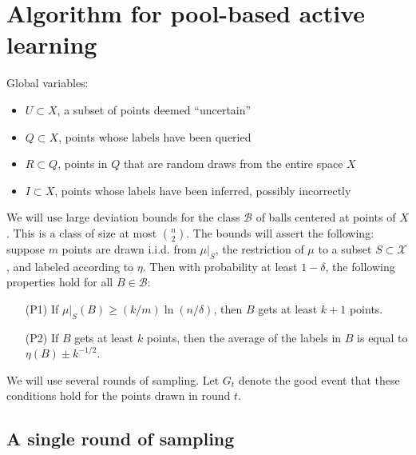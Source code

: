 \documentclass{article}
\def\X{{\mathcal X}}
\def\B{{\mathcal B}}
\begin{document}
\section{Algorithm for pool-based active learning}

Global variables:
\begin{itemize}
\item $U \subset X$, a subset of points deemed ``uncertain''
\item $Q \subset X$, points whose labels have been queried
\item $R \subset Q$, points in $Q$ that are random draws from the entire space $X$
\item $I \subset X$, points whose labels have been inferred, possibly incorrectly
\end{itemize}

We will use large deviation bounds for the class $\B$ of balls centered at points of $X$. This is a class of size at most ${n \choose 2}$. The bounds will assert the following: suppose $m$ points are drawn i.i.d. from $\mu|_S$, the restriction of $\mu$ to a subset $S \subset \X$, and labeled according to $\eta$. Then with probability at least $1-\delta$, the following properties hold for all $B \in \B$:
\begin{enumerate}
\item[(P1)] If $\mu|_S(B) \geq (k/m) \ln (n/\delta)$, then $B$ gets at least $k+1$ points.
\item[(P2)] If $B$ gets at least $k$ points, then the average of the labels in $B$ is equal to $\eta(B) \pm k^{-1/2}$.
\end{enumerate}
We will use several rounds of sampling. Let $G_t$ denote the good event that these conditions hold for the points drawn in round $t$.

\subsection{A single round of sampling}
\end{document}
